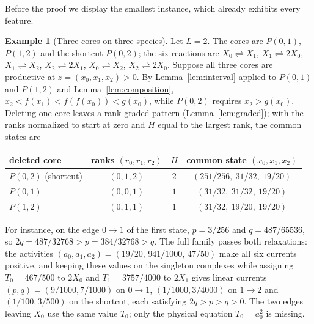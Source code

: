 \documentclass[11pt,a4paper]{article}
\theoremstyle{plain}
\theoremstyle{definition}
\newtheorem{example}[theorem]{Example}
\theoremstyle{remark}
\newcommand{\rev}{\rightleftharpoons}
\begin{document}
Before the proof we display the smallest instance, which already exhibits every feature.

\begin{example}[Three cores on three species]\label{ex:three}
Let $L=2$. The cores are $P(0,1)$, $P(1,2)$ and the shortcut $P(0,2)$; the six reactions are $X_0\rev X_1$, $X_1\rev2X_0$, $X_1\rev X_2$, $X_2\rev2X_1$, $X_0\rev X_2$, $X_2\rev2X_0$. Suppose all three cores are productive at $z=(x_0,x_1,x_2)>0$. By Lemma~\ref{lem:interval} applied to $P(0,1)$ and $P(1,2)$ and Lemma~\ref{lem:composition}, $x_2<f(x_1)<f(f(x_0))<g(x_0)$, while $P(0,2)$ requires $x_2>g(x_0)$. Deleting one core leaves a rank-graded pattern (Lemma~\ref{lem:graded}); with the ranks normalized to start at zero and $H$ equal to the largest rank, the common states are
\begin{center}
\begin{tabular}{@{}lccc@{}}
\toprule
deleted core & ranks $(r_0,r_1,r_2)$ & $H$ & common state $(x_0,x_1,x_2)$ \\
\midrule
$P(0,2)$ (shortcut) & $(0,1,2)$ & $2$ & $(251/256,\ 31/32,\ 19/20)$ \\
$P(0,1)$ & $(0,0,1)$ & $1$ & $(31/32,\ 31/32,\ 19/20)$ \\
$P(1,2)$ & $(0,1,1)$ & $1$ & $(31/32,\ 19/20,\ 19/20)$ \\
\bottomrule
\end{tabular}
\end{center}
For instance, on the edge $0\to1$ of the first state, $p=3/256$ and $q=487/65536$, so $2q=487/32768>p=384/32768>q$. The full family passes both relaxations: the activities $(a_0,a_1,a_2)=(19/20,\,941/1000,\,47/50)$ make all six currents positive, and keeping these values on the singleton complexes while assigning $T_0=467/500$ to $2X_0$ and $T_1=3757/4000$ to $2X_1$ gives linear currents $(p,q)=(9/1000,7/1000)$ on $0\to1$, $(1/1000,3/4000)$ on $1\to2$ and $(1/100,3/500)$ on the shortcut, each satisfying $2q>p>q>0$. The two edges leaving $X_0$ use the same value $T_0$; only the physical equation $T_0=a_0^2$ is missing.
\end{example}
\end{document}
